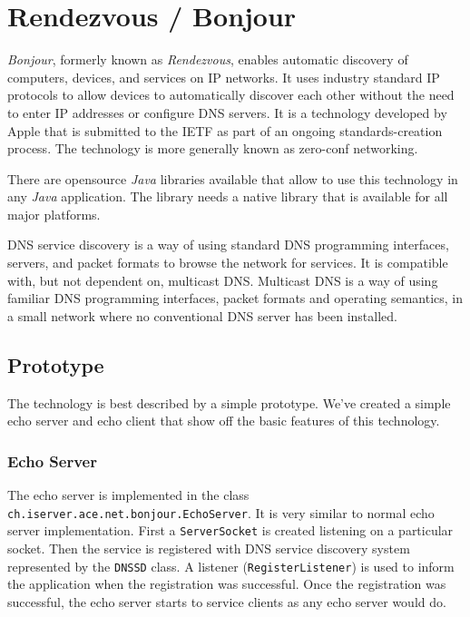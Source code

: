 \section{Rendezvous / Bonjour}
\label{sect:bonjour}

\emph{Bonjour}, formerly known as \emph{Rendezvous}, enables automatic discovery of computers, devices, and services on IP networks. It uses industry standard IP protocols to allow devices to automatically discover each other without the need to enter IP addresses or configure DNS servers. It is a technology developed by Apple that is submitted to the IETF as part of an ongoing standards-creation process. The technology is more generally known as zero-conf networking.

There are opensource \emph{Java} libraries available that allow to use this technology in any \emph{Java} application. The library needs a native library that is available for all major platforms. 

DNS service discovery is a way of using standard DNS programming interfaces, servers, and packet formats to browse the network for services. It is compatible with, but not dependent on, multicast DNS. Multicast DNS is a way of using familiar DNS programming interfaces, packet formats and operating semantics, in a small network where no conventional DNS server has been installed.


\subsection{Prototype}
The technology is best described by a simple prototype. We've created a simple echo server and echo client that show off the basic features of this technology.

\subsubsection{Echo Server}
The echo server is implemented in the class \texttt{ch.iserver.ace.net.bonjour.EchoServer}. It is very similar to normal echo server implementation. First a \texttt{ServerSocket} is created listening on a particular socket. Then the service is registered with DNS service discovery system represented by the \texttt{DNSSD} class. A listener (\texttt{RegisterListener}) is used to inform the application when the registration was successful. Once the registration was successful, the echo server starts to service clients as any echo server would do.

